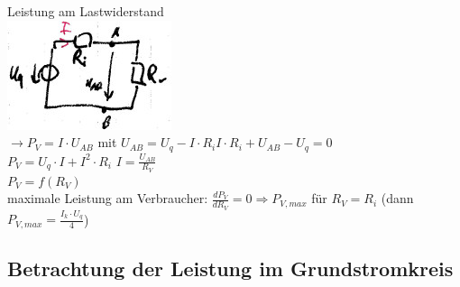 Leistung am Lastwiderstand\\
\includegraphics[scale=.75]{Abbildungen/ABB313}\\
$\rightarrow P_V = I\cdot U_{AB}$ \quad mit $U_{AB}=U_q-I\cdot R_i$\quad $I\cdot R_i + U_{AB}-U_q=0$\\
$P_V=U_q\cdot I + I^2 \cdot R_i$ \quad $I=\frac{U_{AB}}{R_V}$\\
$P_V=f(R_V)$\\
maximale Leistung am Verbraucher: $\frac{d P_V}{dR_V}=0 \Rightarrow P_{V,max}$ für $R_V=R_i$ (dann $P_{V,max}=\frac{I_k \cdot U_q}{4}$)

\subsection{Betrachtung der Leistung im Grundstromkreis}

